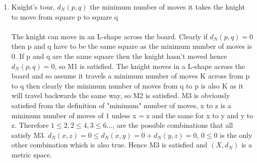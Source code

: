 \documentclass[,oneside]{article}
\numberwithin{equation}{section}
\begin{document}
\begin{enumerate}[label=(\roman*)]
   \item Knight's tour, $d_N(p,q)$ the minimum number of moves it takes the knight to move from square p to square q\\
   \\ The knight can move in an L-shape across the board. Clearly if $d_N(p,q)=0$ then p and q have to be the same square as the minimum number of moves is 0. If p and q are the same square then the knight hasn't moved hence $d_N(p,q)=0$, so M1 is satisfied. The knight moves in a L-shape across the board and so assume it travels a minimum number of moves K across from p to q then clearly the minimum number of moves from q to p is also K as it will travel backwards the same way, so M2 is satisfied. M3 is obviously satisfied from the definition of "minimum" number of moves, x to z is a minimum number of moves of 1 unless x = z and the same for x to y and y to z. Therefore $1 \leq 2, 2 \leq 4, 3 \leq 6...$, are the possible combinations that all satisfy M3. $d_N(x,z)=0 \leq d_N(x,y)=0+d_N(y,z)=0$, $0 \leq 0$ is the only other combination which is also true. Hence M3 is satisfied and $(X, d_N)$ is a metric space.
   \end{enumerate}
   
\end{document}
